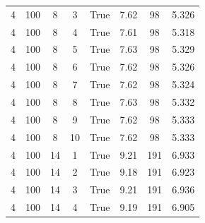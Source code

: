 \begin{table}[H]
{\begin{tabular}{cccccccc}
			4             & 100                             & 8                            & 3            & True             & 7.62                   & 98            & 5.326             \\
			4             & 100                             & 8                            & 4            & True             & 7.61                   & 98            & 5.318             \\
			4             & 100                             & 8                            & 5            & True             & 7.63                   & 98            & 5.329             \\
			4             & 100                             & 8                            & 6            & True             & 7.62                   & 98            & 5.326             \\
			4             & 100                             & 8                            & 7            & True             & 7.62                   & 98            & 5.324             \\
			4             & 100                             & 8                            & 8            & True             & 7.63                   & 98            & 5.332             \\
			4             & 100                             & 8                            & 9            & True             & 7.62                   & 98            & 5.333             \\
			4             & 100                             & 8                            & 10           & True             & 7.62                   & 98            & 5.333             \\
			\midrule
			4             & 100                             & 14                           & 1            & True             & 9.21                   & 191           & 6.933             \\
			4             & 100                             & 14                           & 2            & True             & 9.18                   & 191           & 6.923             \\
			4             & 100                             & 14                           & 3            & True             & 9.21                   & 191           & 6.936             \\
			4             & 100                             & 14                           & 4            & True             & 9.19                   & 191           & 6.905             \\

\end{tabular}}
\end{table}
